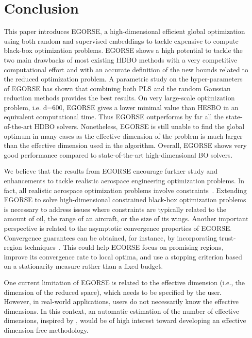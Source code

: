 \section{Conclusion}
\label{sec:conclusion}

This paper introduces EGORSE, a high-dimensional efficient global optimization using both random and supervised embeddings to tackle expensive to compute black-box optimization problems.
EGORSE shows a high potential to tackle the two main drawbacks of most existing HDBO methods with a very competitive computational effort and with an accurate definition of the new bounds related to the reduced optimization problem.
A parametric study on the hyper-parameters of EGORSE has shown that combining both PLS and the random Gaussian reduction methods provides the best results. On very large-scale optimization problem, i.e. d=600, EGORSE gives a lower minimal value than HESBO in an equivalent computational time. 
Thus EGORSE outperforms by far all the state-of-the-art HDBO solvers.
Nonetheless, EGORSE is still unable to find the global optimum in many cases as the effective dimension of the problem is much larger than the effective dimension used in the algorithm. {\color{black}Overall, EGORSE shows very good performance compared to state-of-the-art high-dimensional BO solvers.}


{\color{black} We believe that the results from EGORSE encourage further study and enhancements to tackle realistic aerospace engineering optimization problems. In fact, all realistic aerospace optimization problems involve constraints~\cite{priemEfficientApplicationBayesian2020a, raponi2020high,prestch2024}. Extending EGORSE to solve high-dimensional constrained black-box optimization problems is necessary to address issues where constraints are typically related to the amount of oil, the range of an aircraft, or the size of its wings. Another important perspective is related to the asymptotic convergence properties of EGORSE. Convergence guarantees can be obtained, for instance, by incorporating trust-region techniques~\cite{YDIOUANE_2023}. This could help EGORSE focus on promising regions, improve its convergence rate to local optima, and use a stopping criterion based on a stationarity measure rather than a fixed budget. 

One current limitation of EGORSE is related to the effective dimension (i.e., the dimension of the reduced space), which needs to be specified by the user. However, in real-world applications, users do not necessarily know the effective dimensions. In this context, an automatic estimation of the number of effective dimensions, inspired by \cite{SciTech_cat}, would be of high interest toward developing an effective dimension-free methodology.}


